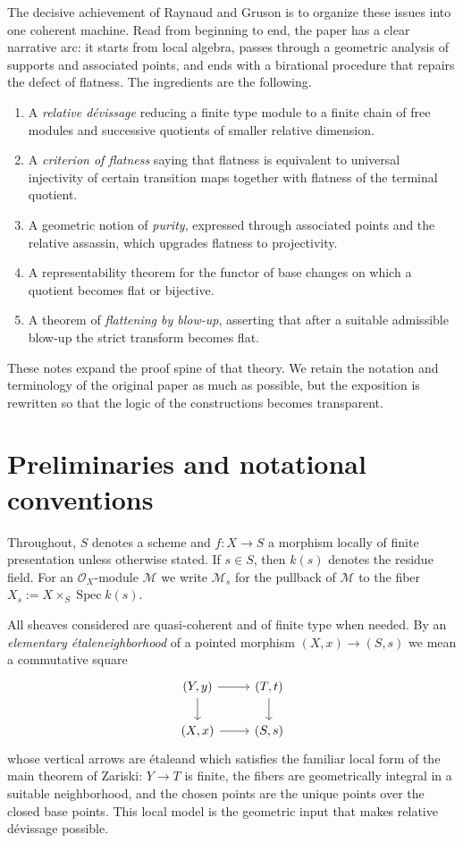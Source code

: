 \documentclass[11pt,oneside]{article}
\newcommand{\M}{\mathcal M}
\newcommand{\OO}{\mathcal O}
\newcommand{\Spec}{\operatorname{Spec}}
\newcommand{\etale}{\'etale}
\begin{document}
The decisive achievement of Raynaud and Gruson is to organize these issues into one coherent machine.  Read from beginning to end, the paper has a clear narrative arc: it starts from local algebra, passes through a geometric analysis of supports and associated points, and ends with a birational procedure that repairs the defect of flatness.  The ingredients are the following.
\begin{enumerate}[label=(\roman*)]
  \item A \emph{relative d\'evissage} reducing a finite type module to a finite chain of free modules and successive quotients of smaller relative dimension.
  \item A \emph{criterion of flatness} saying that flatness is equivalent to universal injectivity of certain transition maps together with flatness of the terminal quotient.
  \item A geometric notion of \emph{purity}, expressed through associated points and the relative assassin, which upgrades flatness to projectivity.
  \item A representability theorem for the functor of base changes on which a quotient becomes flat or bijective.
  \item A theorem of \emph{flattening by blow-up}, asserting that after a suitable admissible blow-up the strict transform becomes flat.
\end{enumerate}

These notes expand the proof spine of that theory.  We retain the notation and terminology of the original paper as much as possible, but the exposition is rewritten so that the logic of the constructions becomes transparent.

\section{Preliminaries and notational conventions}

Throughout, $S$ denotes a scheme and $f\colon X\to S$ a morphism locally of finite presentation unless otherwise stated.  If $s\in S$, then $k(s)$ denotes the residue field.  For an $\OO_X$-module $\M$ we write $\M_s$ for the pullback of $\M$ to the fiber $X_s:=X\times_S\Spec k(s)$.

All sheaves considered are quasi-coherent and of finite type when needed.  By an \emph{elementary \etale neighborhood} of a pointed morphism $(X,x)\to (S,s)$ we mean a commutative square
\[
\begin{tikzcd}
(Y,y) \ar[r] \ar[d] & (T,t) \ar[d]\\
(X,x) \ar[r] & (S,s)
\end{tikzcd}
\]
whose vertical arrows are \etale and which satisfies the familiar local form of the main theorem of Zariski: $Y\to T$ is finite, the fibers are geometrically integral in a suitable neighborhood, and the chosen points are the unique points over the closed base points.  This local model is the geometric input that makes relative d\'evissage possible.
\end{document}
